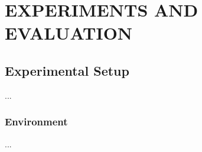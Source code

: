%

\chapter{EXPERIMENTS AND EVALUATION}
\label{chap:experiments}

\section{Experimental Setup}
...

\subsection{Environment}
...

